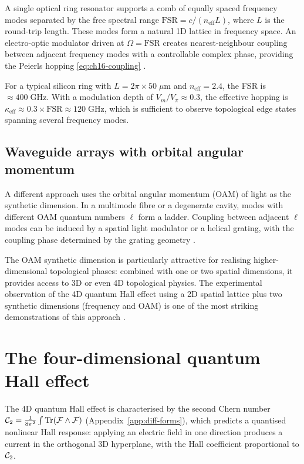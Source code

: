 A single optical ring resonator supports a comb of equally spaced
frequency modes separated by the free spectral range
$\mathrm{FSR}=c/(n_{\mathrm{eff}}L)$, where $L$ is the round-trip
length.  These modes form a natural 1D lattice in frequency space.
An electro-optic modulator driven at $\Omega=\mathrm{FSR}$ creates
nearest-neighbour coupling between adjacent frequency modes with a
controllable complex phase, providing the Peierls hopping
\eqref{eq:ch16-coupling} \cite{ozawa2018topological,price2022roadmap}.

For a typical silicon ring with $L=2\pi\times 50\;\mu\mathrm{m}$ and
$n_{\mathrm{eff}}=2.4$, the FSR is $\approx 400\;\mathrm{GHz}$.
With a modulation depth of $V_m/V_\pi\approx 0.3$, the effective
hopping is $\kappa_{\mathrm{eff}}\approx 0.3\times\mathrm{FSR}
\approx 120\;\mathrm{GHz}$, which is sufficient to observe topological
edge states spanning several frequency modes.

\subsection{Waveguide arrays with orbital angular momentum}
\label{sec:ch16-oam-synthetic}

A different approach uses the orbital angular momentum (OAM) of light
as the synthetic dimension.  In a multimode fibre or a degenerate
cavity, modes with different OAM quantum numbers $\ell$ form a
ladder.  Coupling between adjacent $\ell$ modes can be induced by
a spatial light modulator or a helical grating, with the coupling
phase determined by the grating geometry
\cite{price2022roadmap}.

The OAM synthetic dimension is particularly attractive for realising
higher-dimensional topological phases: combined with one or two
spatial dimensions, it provides access to 3D or even 4D topological
physics.  The experimental observation of the 4D quantum Hall effect
using a 2D spatial lattice plus two synthetic dimensions (frequency
and OAM) is one of the most striking demonstrations of this approach
\cite{ozawa2018topological}.

\section{The four-dimensional quantum Hall effect}
\label{sec:ch16-4d-qhe}

The 4D quantum Hall effect is characterised by the second Chern
number $\mathcal{C}_2=\frac{1}{8\pi^2}\int\operatorname{Tr}(\mathcal{F}\wedge
\mathcal{F})$ (Appendix~\ref{app:diff-forms}), which predicts a
quantised nonlinear Hall response: applying an electric field in one
direction produces a current in the orthogonal 3D hyperplane, with
the Hall coefficient proportional to $\mathcal{C}_2$.


